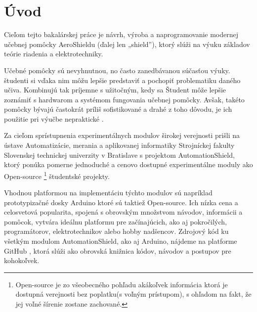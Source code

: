 \chapter*{Úvod}
\label{UVOD}


Cieľom tejto bakalárskej práce je návrh, výroba a naprogramovanie modernej učebnej pomôcky AeroShieldu (ďalej len „shield”), ktorý slúži na výuku základov teórie riadenia a elektrotechniky.

Učebné pomôcky sú nevyhnutnou, no často zanedbávanou súčasťou výuky. študenti si vďaka nim môžu lepšie predstaviť a pochopiť problematiku daného učiva. Kombinujú tak príjemne s užitočným, kedy sa Študent môže lepšie zoznámiť s hardwarom a systémom fungovania učebnej pomôcky.
Avšak, takéto pomôcky bývajú častokrát príliš sofistikované a drahé \cite{Hor} z toho dôvodu, je ich použitie pri výučbe nepraktické .

Za cieľom sprístupnenia experimentálnych modulov širokej verejnosti prišli na ústave Automatizácie, merania a aplikovanej informatiky
Strojníckej fakulty Slovenskej technickej univerzity v Bratislave s projektom AutomationShield, ktorý ponúka pomerne jednoduché a cenovo dostupné experimentálne moduly ako Open-source \footnote[1]{Open-source je zo všeobecného pohľadu akákoľvek informácia ktorá je dostupná verejnosti bez poplatku(s voľným prístupom), s ohľadom na fakt, že jej voľné šírenie zostane zachované.} študentské projekty.

Vhodnou platformou na implementáciu týchto modulov sú napríklad prototypizačné dosky Arduino ktoré sú taktiež Open-source. Ich nízka cena a celosvetová popularita, spojená s obrovským množstvom návodov, informácii a pomôcok, vytvára ideálnu platformu pre začínajúcich, ako aj pokročilých, programátorov, elektrotechnikov alebo hobby nadšencov. Zdrojový kód ku všetkým modulom AutomationShield, ako aj Arduino, nájdeme na platforme GitHub \cite{Git}, ktorá slúži ako obrovská knižnica kódov, návodov a postupov pre kohokoľvek.

